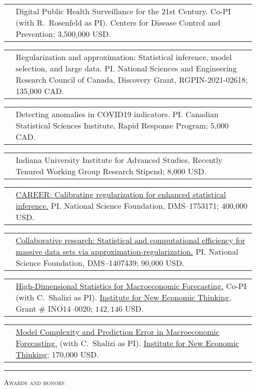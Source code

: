 \documentclass[11pt,letterpaper]{minimal/moderncv}
\makeatletter
\renewcommand{\section}[1]{  \par\addvspace{15pt}%
  \parbox[t]{\hintscolumnwidth}{\strut\raggedleft\raisebox{4pt}%
  {\rule{\hintscolumnwidth}{2pt}}}%
  \hspace{\separatorcolumnwidth}%
  \textsc{\Large #1}\par\nobreak\addvspace{6pt}%
}
\renewcommand*{\cvitem}[2]{%
  \begin{tabular}{@{}p{\hintscolumnwidth}@{\hspace{\separatorcolumnwidth}}%
    p{\maincolumnwidth}@{}}%
    \raggedleft {#1} &  {#2}%
  \end{tabular}%
}
\makeatother
\begin{document}
\cvitem{2023}{Digital Public Health Surveillance for the 21st Century. Co-PI
(with R.\ Rosenfeld as PI). Centers for Disease Control and Prevention;
3,500,000 USD.}


\cvitem{2021--2025}{Regularization and approximation: Statistical inference,
  model selection, and large data. PI. National Sciences and Engineering
  Research Council of Canada, Discovery Grant, RGPIN-2021-02618; 135,000 CAD.}

\cvitem{2020--2021}{Detecting anomalies in COVID19
  indicators. PI. Canadian Statistical Sciences Institute, Rapid
  Response Program; 5,000 CAD.}

\cvitem{2019--2020}{Indiana University Institute for Advanced Studies, Recently
  Tenured Working Group Research Stipend; 8,000 USD.}

\cvitem{2018--2023}{\href{http://www.nsf.gov/awardsearch/showAward?AWD_ID=1753171}{CAREER:
  Calibrating regularization for enhanced statistical inference.}
PI. National Science Foundation, DMS--1753171; 400,000 USD.}


\cvitem{2014--2018}{\href{http://www.nsf.gov/awardsearch/showAward?AWD_ID=1407439}{Collaborative
  research: Statistical and computational efficiency for 
massive data sets via approximation-regularization.} PI. National
Science Foundation, DMS--1407439; 90,000 USD.}


\cvitem{2014--2016}{\href{https://www.ineteconomics.org/research/grants/high-dimensional-statistics-for-macroeconomic-forecasting}
{High-Dimensional Statistics for Macroeconomic Forecasting.} Co-PI (with C.\ Shalizi as PI). \href{http://ineteconomics.org}{Institute for New Economic Thinking}, Grant \# INO14--0020; $142,146$ USD.}


\cvitem{2011--2013}{\href{https://www.ineteconomics.org/research/grants/model-complexity-and-prediction-error-in-macroeconomic-forecasting} 
{Model Complexity and Prediction Error in Macroeconomic Forecasting.}
(with C.\ Shalizi as PI).
\href{http://ineteconomics.org}{Institute for New Economic
  Thinking}; 170,000 USD.}


  
\section{Awards and honors}
\end{document}
